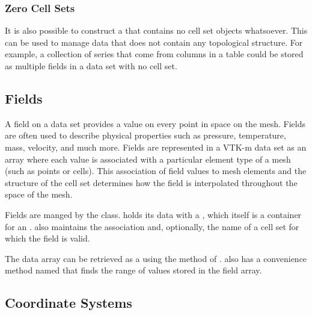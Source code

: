 \subsubsection{Zero Cell Sets}

It is also possible to construct a  that contains no cell
set objects whatsoever. This can be used to manage data that does not
contain any topological structure. For example, a collection of series that
come from columns in a table could be stored as multiple fields in a data
set with no cell set.


\subsection{Fields}
\label{sec:DataSets:Fields}


A field on a data set provides a value on every point in space on the mesh.
Fields are often used to describe physical properties such as pressure,
temperature, mass, velocity, and much more. Fields are represented in a
VTK-m data set as an array where each value is associated with a particular
element type of a mesh (such as points or cells). This association of field
values to mesh elements and the structure of the cell set determines how
the field is interpolated throughout the space of the mesh.

Fields are manged by the  class. 
holds its data with a , which itself is
a container for an . 
also maintains the association and, optionally, the name of a cell set for
which the field is valid.

The data array can be retrieved as a 
using the  method of .
 also has a convenience method named
 that finds the range of values stored in the field
array.


\subsection{Coordinate Systems}
\label{sec:DataSets:CoordinateSystems}


